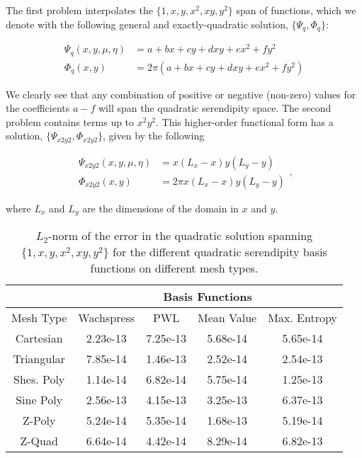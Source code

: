 \documentclass[preprint,10pt]{elsarticle}
\begin{document}
The first problem interpolates the $\{ 1, x, y, x^2, xy, y^2 \}$ span of functions, which we denote with the following general and exactly-quadratic solution, $\{\Psi_q, \Phi_q\}$:

\begin{equation}
\label{eq::Results_Quadratic_fluxsols}
\begin{aligned}
\Psi_q (x,y,\mu,\eta) &= a + bx + c y+ d xy + e x^2 + fy^2 \\
\Phi_q (x,y) &= 2 \pi \left(  a + bx + c y+ d xy + e x^2 + fy^2 \right)
\end{aligned} 
\end{equation}

\noindent We clearly see that any combination of positive or negative (non-zero) values for the coefficients $a-f$ will span the quadratic serendipity space. The second problem contains terms up to $x^2 y^2$. This higher-order functional form has a solution, $\{ \Psi_{x2y2}, \Phi_{x2y2}\}$, given by the following

\begin{equation}
\label{eq::Results_x2y2_fluxsols}
\begin{aligned}
\Psi_{x2y2} (x,y,\mu,\eta) &= x \left(L_x - x \right) y \left(L_y - y \right) \\
\Phi_{x2y2} (x,y) &= 2 \pi x \left(L_x - x \right) y \left(L_y - y \right) 
\end{aligned} ,
\end{equation}

\noindent where $L_x$ and $L_y$ are the dimensions of the domain in $x$ and $y$.

\begin{table}[hbt]
\caption{$L_2$-norm of the error in the quadratic solution spanning $\{ 1, x, y, x^2, xy, y^2 \}$ for the different quadratic serendipity basis functions on different mesh types.}
\centering
\def\arraystretch{1.25}
\begin{tabular}{|c|c|c|c|c|}
\hline
& \multicolumn{4}{c}{Basis Functions}\vline\\
\hline
Mesh Type & Wachspress & PWL& Mean Value& Max. Entropy \\
\hline
Cartesian&2.23e-13&7.25e-13&5.68e-14&5.65e-14\\
Triangular&7.85e-14&1.46e-13&2.52e-14&2.54e-13\\
Shes. Poly&1.14e-14&6.82e-14&5.75e-14&1.25e-13\\
Sine Poly&2.56e-13&4.15e-13&3.25e-13&6.37e-13\\
Z-Poly&5.24e-14&5.35e-14&1.68e-13&5.19e-14\\
Z-Quad&6.64e-14&4.42e-14&8.29e-14&6.82e-13\\
\hline
\end{tabular}
\end{table}
\end{document}
